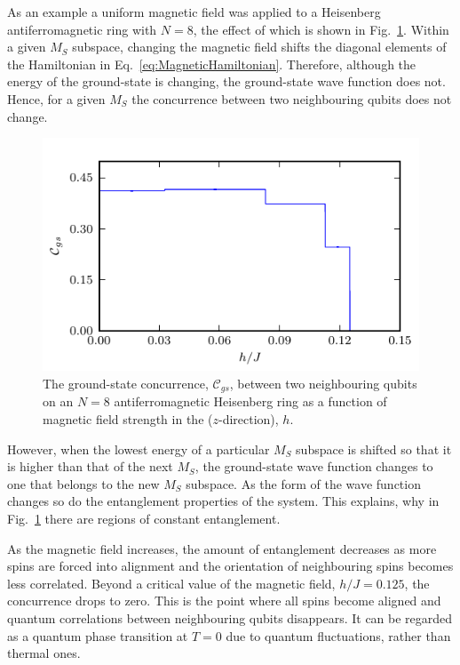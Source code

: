 As an example a uniform magnetic field was applied to a Heisenberg antiferromagnetic ring with $N=8$, the effect of which is shown in Fig.~\ref{fig:8_chain_concurrence_varying_mag_field}. Within a given $M_S$ subspace, changing the magnetic field shifts the diagonal elements of the Hamiltonian in Eq.~\ref{eq:MagneticHamiltonian}. Therefore, although the energy of the ground-state is changing, the ground-state wave function does not. Hence, for a given $M_S$ the concurrence between two neighbouring qubits does not change.
\begin{figure}[H]
\begin{center}
\includegraphics[width =1\textwidth]{8_chain_concurrence_varying_mag_field.pdf}
\caption{The ground-state concurrence, $\mathcal{C}_{gs}$, between two neighbouring qubits on an $N=8$ antiferromagnetic Heisenberg ring as a function of magnetic field strength in the ($z$-direction), $h$.}
\label{fig:8_chain_concurrence_varying_mag_field}
\end{center}
\end{figure}

However, when the lowest energy of a particular $M_S$ subspace is shifted so that it is higher than that of the next $M_S$, the ground-state wave function changes to one that belongs to the new $M_S$ subspace. As the form of the wave function changes so do the entanglement properties of the system. This explains, why in Fig.~\ref{fig:8_chain_concurrence_varying_mag_field} there are regions of constant entanglement. 

As the magnetic field increases, the amount of entanglement decreases as more spins are forced into alignment and the orientation of neighbouring spins becomes less correlated. Beyond a critical value of the magnetic field, $h/J = 0.125$, the concurrence drops to zero. This is the point where all spins become aligned and quantum correlations between neighbouring qubits disappears. It can be regarded as a quantum phase transition at $T=0$ due to quantum fluctuations, rather than thermal ones\cite{RudolphPrivate}.

